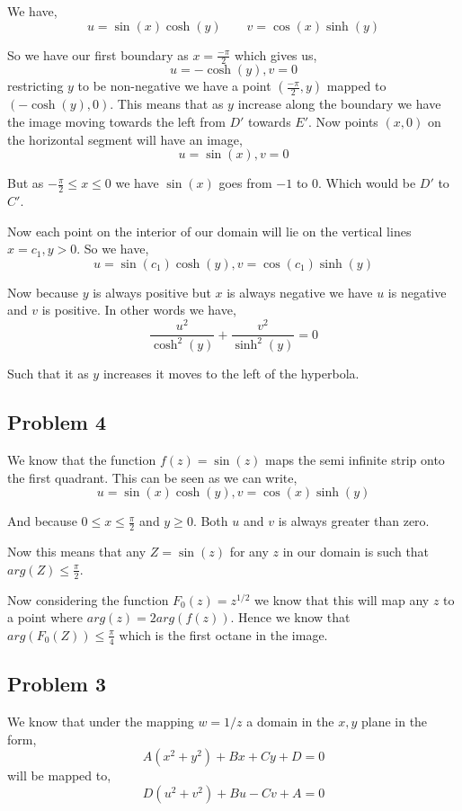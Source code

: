 \documentclass[a4paper]{report}
\begin{document}
 We have, 
 $$ u = \sin(x) \cosh(y) \qquad v = \cos(x)\sinh(y) $$ 

 So we have our first boundary as $x = \frac{-\pi}{2}$ which gives us, 
 $$ u = -\cosh(y), v = 0$$ restricting $y $ to be non-negative we have a point $(\frac{-\pi}{2},y)$ mapped to $(-\cosh(y), 0)$. This means that as $y$ increase along the boundary we have the image moving towards the left from $D'$ towards $E'$. Now points $(x,0)$ on the horizontal segment will have an image, 
 $$ u = \sin(x), v = 0 $$ 

 But as $-\frac{\pi}{2} \le x \le 0$ we have $\sin(x)$ goes from $-1$ to $0$. Which would be  $D'$ to $C'$.

 Now each point on the interior of our domain will lie on the vertical lines $x = c_1,y >0$. So we have, 
 $$ u = \sin(c_1)\cosh(y), v = \cos(c_1)\sinh(y) $$ 

 Now because $y$ is always positive  but $x$ is always negative we have $u$ is negative and $v$ is positive. In other words we have, 
 $$ \frac{u^2}{\cosh^2(y)}  + \frac{v^2}{\sinh^2(y)} = 0$$ 

 Such that it as $y$ increases it moves to the left of the hyperbola.


\subsection*{Problem 4}
We know that the function $f(z) = \sin(z)$ maps the semi infinite strip onto the first quadrant. This can be seen as we can write, 
$$ u = \sin(x) \cosh(y), v = \cos(x)\sinh(y) $$

And because $0 \le x \le \frac{\pi}{2}$ and $y \ge 0$. Both  $u$ and $v$ is always greater than zero.

Now this means that any $Z = \sin(z)$ for any $z$ in our domain is such that $arg(Z) \le \frac{\pi}{2}$.

Now considering the function $F_0(z) = z^{1 /2}$ we know that this will map any $z $ to a point where $arg(z) = 2 arg(f(z))$. Hence we know that $arg(F_0(Z)) \le \frac{\pi}{4}$ which is the first octane in the image.


\subsection*{Problem 3}
We know that under the mapping $w = 1 /z$ a domain in the $x,y$ plane in the form, 
$$ A(x^2 + y^2) + Bx + Cy + D = 0 $$  will be mapped to, 
$$ D(u^2 + v^2) + Bu - Cv + A = 0 $$ 
\end{document}
